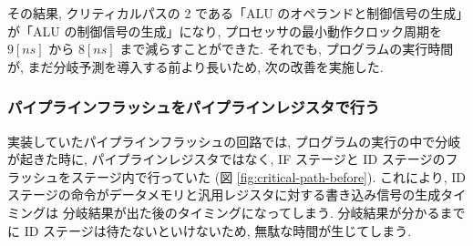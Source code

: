 \documentclass[../improvements.tex]{subfiles}
\begin{document}
  その結果, クリティカルパスの 2 である「ALU のオペランドと制御信号の生成」が「ALU の制御信号の生成」になり, 
  プロセッサの最小動作クロック周期を $9[ns]$ から $8[ns]$ まで減らすことができた.
  それでも, プログラムの実行時間が, まだ分岐予測を導入する前より長いため, 次の改善を実施した.

  \subsubsection{パイプラインフラッシュをパイプラインレジスタで行う} \label{subsubsection:rethink-flush}
  実装していたパイプラインフラッシュの回路では, 
  プログラムの実行の中で分岐が起きた時に, 
  パイプラインレジスタではなく, IF ステージと ID ステージのフラッシュをステージ内で行っていた (図 \ref{fig:critical-path-before}).
  これにより, ID ステージの命令がデータメモリと汎用レジスタに対する書き込み信号の生成タイミングは
  分岐結果が出た後のタイミングになってしまう.
  分岐結果が分かるまでに ID ステージは待たないといけないため, 無駄な時間が生じてしまう.
\end{document}
